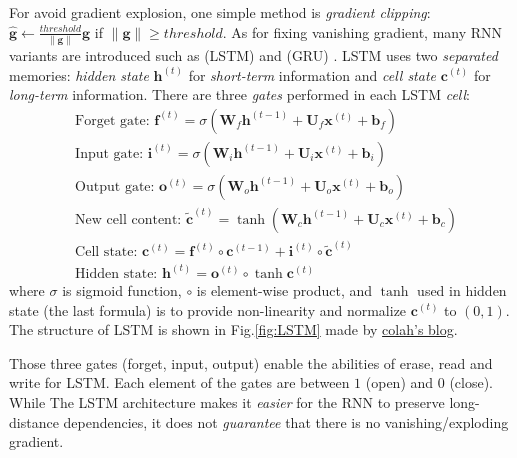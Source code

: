 For avoid gradient explosion, one simple method is \emph{gradient clipping}: $\hat{\bm{g}} \leftarrow \frac{threshold}{\lVert \bm{g} \rVert} \bm{g}$ if $\lVert \bm{g} \rVert \ge threshold$.
As for fixing vanishing gradient, many RNN variants are introduced such as  (LSTM)  and  (GRU) .
LSTM uses two \emph{separated} memories: \emph{hidden state} $\bm{h}^{(t)}$ for \emph{short-term} information and \emph{cell state} $\bm{c}^{(t)}$ for \emph{long-term} information.
There are three \emph{gates} performed in each LSTM \emph{cell}:
\begin{align}
&\text{Forget gate: } \bm{f}^{(t)} = \sigma(\bm{W}_f \bm{h}^{(t-1)} + \bm{U}_f \bm{x}^{(t)} + \bm{b}_f) \nonumber \\
&\text{Input gate: } \bm{i}^{(t)} = \sigma(\bm{W}_i \bm{h}^{(t-1)} + \bm{U}_i \bm{x}^{(t)} + \bm{b}_i) \nonumber \\
&\text{Output gate: } \bm{o}^{(t)} = \sigma(\bm{W}_o \bm{h}^{(t-1)} + \bm{U}_o \bm{x}^{(t)} + \bm{b}_o) \nonumber \\
&\text{New cell content: } \tilde{\bm{c}}^{(t)} = \tanh \left(\bm{W}_c \bm{h}^{(t-1)} + \bm{U}_c \bm{x}^{(t)} + \bm{b}_c \right) \nonumber \\
&\text{Cell state: } \bm{c}^{(t)} = \bm{f}^{(t)} \circ \bm{c}^{(t-1)} + \bm{i}^{(t)} \circ \tilde{\bm{c}}^{(t)} \nonumber \\
&\text{Hidden state: } \bm{h}^{(t)} = \bm{o}^{(t)} \circ \tanh \bm{c}^{(t)} \nonumber
\end{align}
where $\sigma$ is sigmoid function, $\circ$ is element-wise product, and $\tanh$ used in hidden state (the last formula) is to provide non-linearity and normalize $\bm{c}^{(t)}$ to $(0, 1)$.
The structure of LSTM is shown in Fig.\ref{fig:LSTM} made by \href{http://colah.github.io/posts/2015-08-Understanding-LSTMs/}{colah's blog}.


Those three gates (forget, input, output) enable the abilities of erase, read and write for LSTM.
Each element of the gates are between $1$ (open) and $0$ (close).
While The LSTM architecture makes it \emph{easier} for the RNN to preserve long-distance dependencies, it does not \emph{guarantee} that  there is no vanishing/exploding
gradient.


